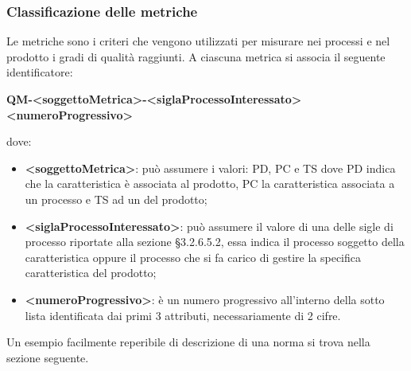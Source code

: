         \subsubsection{Classificazione delle metriche}
            Le metriche sono i criteri che vengono utilizzati per misurare nei processi e nel prodotto i gradi di qualità raggiunti. A ciascuna metrica si associa il seguente identificatore:
            \begin{center}
                \textbf{QM-<soggettoMetrica>-<siglaProcessoInteressato><numeroProgressivo>}
            \end{center}
            dove:
            \begin{itemize}
                \item\textbf{<soggettoMetrica>}: può assumere i valori: PD, PC e TS dove PD indica che la caratteristica è associata al prodotto,  PC la caratteristica associata a un processo e TS ad un  del prodotto;
                \item\textbf{<siglaProcessoInteressato>}: può assumere il valore di una delle sigle di processo riportate alla sezione §3.2.6.5.2, essa indica il processo soggetto della caratteristica oppure il processo che si fa carico di gestire la specifica caratteristica del prodotto;
                \item\textbf{<numeroProgressivo>}: è un numero progressivo all’interno della sotto lista identificata dai primi 3 attributi, necessariamente di 2 cifre.
            \end{itemize}
            Un esempio facilmente reperibile di descrizione di una norma si trova nella sezione seguente.
